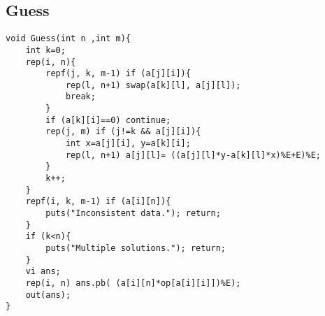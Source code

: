 \subsection{Guess}
\begin{lstlisting}
void Guess(int n ,int m){
	int k=0;
	rep(i, n){
		repf(j, k, m-1) if (a[j][i]){
			rep(l, n+1) swap(a[k][l], a[j][l]);
			break;
		}
		if (a[k][i]==0) continue;
		rep(j, m) if (j!=k && a[j][i]){
			int x=a[j][i], y=a[k][i];
			rep(l, n+1) a[j][l]= ((a[j][l]*y-a[k][l]*x)%E+E)%E;
		}
		k++;
	}
	repf(i, k, m-1) if (a[i][n]){ 
		puts("Inconsistent data."); return;
	}
	if (k<n){
		puts("Multiple solutions."); return;
	}
	vi ans;
	rep(i, n) ans.pb( (a[i][n]*op[a[i][i]])%E);
	out(ans);	
}
\end{lstlisting}
